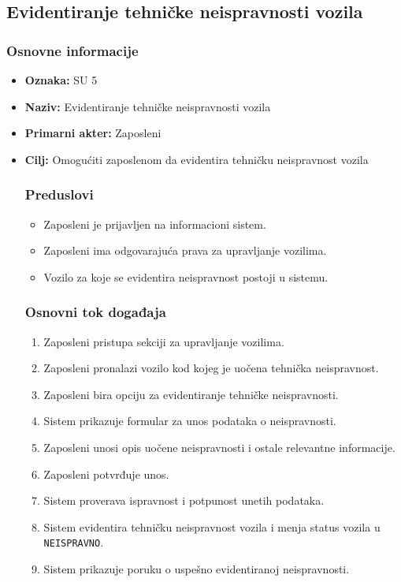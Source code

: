 \subsection{Evidentiranje tehničke neispravnosti vozila}

\subsubsection{Osnovne informacije}

\begin{itemize}
    \item \textbf{Oznaka:} SU 5
    \item \textbf{Naziv:} Evidentiranje tehničke neispravnosti vozila
    \item \textbf{Primarni akter:} Zaposleni
    \item \textbf{Cilj:} Omogućiti zaposlenom da evidentira tehničku neispravnost vozila

\subsubsection{Preduslovi}

\begin{itemize}
    \item Zaposleni je prijavljen na informacioni sistem.
    \item Zaposleni ima odgovarajuća prava za upravljanje vozilima.
    \item Vozilo za koje se evidentira neispravnost postoji u sistemu.
\end{itemize}

\subsubsection{Osnovni tok događaja}

\begin{enumerate}
    \item Zaposleni pristupa sekciji za upravljanje vozilima.
    \item Zaposleni pronalazi vozilo kod kojeg je uočena tehnička neispravnost.
    \item Zaposleni bira opciju za evidentiranje tehničke neispravnosti.
    \item Sistem prikazuje formular za unos podataka o neispravnosti.
    \item Zaposleni unosi opis uočene neispravnosti i ostale relevantne informacije.
    \item Zaposleni potvrđuje unos.
    \item Sistem proverava ispravnost i potpunost unetih podataka.
    \item Sistem evidentira tehničku neispravnost vozila i menja status vozila u \texttt{NEISPRAVNO}.
    \item Sistem prikazuje poruku o uspešno evidentiranoj neispravnosti.
\end{enumerate}


\end{itemize}
